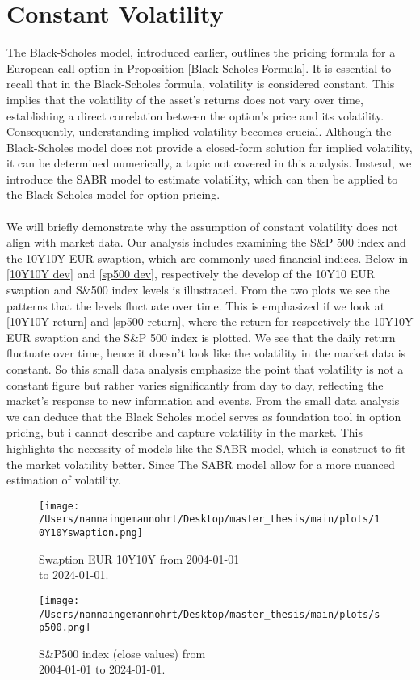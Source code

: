 \section{Constant Volatility}
The Black-Scholes model, introduced earlier, outlines the pricing formula for a European call option in 
Proposition \autoref{Black-Scholes Formula}. It is  essential to recall that in the Black-Scholes formula, 
volatility is considered constant. This implies that the volatility of the asset's returns does not vary over time,
establishing a direct correlation between the option's price and its volatility. Consequently, 
understanding implied volatility becomes crucial. Although the Black-Scholes model does not provide 
a closed-form solution for implied volatility, it can be determined numerically, a topic not covered 
in this analysis. Instead, we introduce the SABR model to estimate volatility, which can then be 
applied to the Black-Scholes model for option pricing.
\\\\
We will briefly demonstrate why the assumption of constant volatility does not align with market data. 
Our analysis includes examining the S$\&$P 500 index and the 10Y10Y EUR swaption, which are commonly used financial indices.
Below in \autoref{10Y10Y dev} and \autoref{sp500 dev}, respectively the develop of the 10Y10 EUR swaption and S$\&$500 index
levels is illustrated. From the two plots we see the patterns that the levels fluctuate over time. This is emphasized
if we look at \autoref{10Y10Y return} and \autoref{sp500 return}, where the return for respectively the 10Y10Y EUR 
swaption and the S$\&$P 500 index is plotted. We see that the daily return fluctuate over time, hence it doesn't look 
like the volatility in the market data is constant. So this small data analysis emphasize the point that volatility is 
not a constant figure but rather varies significantly from day to day, reflecting the market's 
response to new information and events. From the small data analysis we can deduce that the Black Scholes model 
serves as foundation tool in option pricing, but i cannot describe and capture volatility in the market. This highlights 
the necessity of models like the SABR model, which is construct to fit the market volatility better. Since The SABR model
allow for a more nuanced estimation of volatility.
\begin{figure}[h]
    \centering
    \begin{minipage}{0.5\textwidth}
        \texttt{[image: /Users/nannaingemannohrt/Desktop/master\_thesis/main/plots/10Y10Yswaption.png]}
        \caption{Swaption EUR 10Y10Y from  2004-01-01 \\ to 2024-01-01.}
        \label{10Y10Y dev}
    \end{minipage}\hfill 
    \begin{minipage}{0.5\textwidth}
        \texttt{[image: /Users/nannaingemannohrt/Desktop/master\_thesis/main/plots/sp500.png]}
        \caption{S$\&$P500 index (close values) from \\ 2004-01-01 to 2024-01-01.}
        \label{sp500 dev}
    \end{minipage}
\end{figure}

